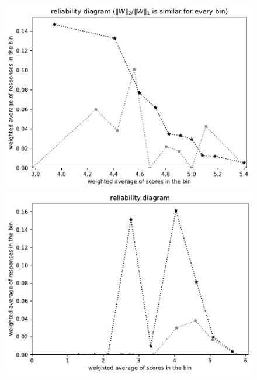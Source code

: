 \documentclass{article}
\newlength{\vertsep}
\newlength{\imsize}
\begin{document}
\begin{figure}
\begin{centering}
\parbox{\imsize}{\includegraphics[width=\imsize]
{../codes/weighted/County_of_Riverside_vs_Butte-LNGI/equierrs10.pdf}}
\quad\quad
\parbox{\imsize}{\includegraphics[width=\imsize]
{../codes/weighted/County_of_Riverside_vs_Butte-LNGI/equiscores10.pdf}}

\vspace{\vertsep}


\end{centering}
\end{figure}
\end{document}
